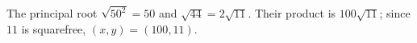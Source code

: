 The principal root $\sqrt{50^2}=50$ and $\sqrt{44}=2\sqrt{11}$. Their product is $100\sqrt{11}$; since $11$ is squarefree, $\boxed{(x,y)=(100,11)}$.
